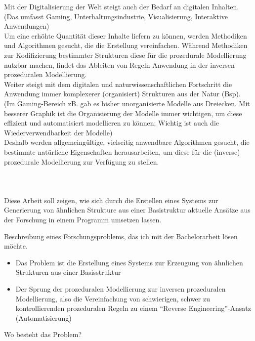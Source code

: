 Mit der Digitalisierung der Welt steigt auch der Bedarf an digitalen Inhalten.\\
(Das umfasst Gaming, Unterhaltungsindustrie, Visualisierung, Interaktive Anwendungen)\\
Um eine erhöhte Quantität dieser Inhalte liefern zu können, werden Methodiken und Algorithmen gesucht, die die Erstellung
vereinfachen.
Während Methodiken zur Kodifizierung bestimmter Strukturen diese für die prozedurale Modellierung nutzbar machen,
findet das Ableiten von Regeln Anwendung in der inversen prozeduralen Modellierung.\\
Weiter steigt mit dem digitalen und naturwissenschaftlichen Fortschritt die Anwendung immer komplexerer (organisiert)
Strukturen aus der Natur (Bsp).\\
(Im Gaming-Bereich zB. gab es bisher unorganisierte Modelle aus Dreiecken. Mit besserer Graphik ist die Organisierung der
Modelle immer wichtigen, um diese effizient und automatisiert modellieren zu können; Wichtig ist auch die Wiederverwendbarkeit
der Modelle)\\
Deshalb werden allgemeingültige, vielseitig anwendbare Algorithmen gesucht, die bestimmte natürliche Eigenschaften
herausarbeiten, um diese für die (inverse) prozedurale Modellierung zur Verfügung zu stellen.
\\~\\

\\~\\
Diese Arbeit soll zeigen, wie sich durch die Erstellen eines Systems zur Generierung von ähnlichen Strukture aus einer
Basistruktur aktuelle Ansätze aus der Forschung in einem Programm umsetzen lassen.





Beschreibung eines Forschungsproblems, das ich mit der Bachelorarbeit lösen möchte.

\begin{itemize}
    \item Das Problem ist die Erstellung eines Systems zur Erzeugung von ähnlichen Strukturen aus einer Basisstruktur
    \item Der Sprung der prozeduralen Modellierung zur inversen prozeduralen Modellierung, also die Vereinfachung von schwierigen,
    schwer zu kontrollierenden prozeduralen Regeln zu einem "`Reverse Engineering"'-Ansatz (Automatisierung)
\end{itemize}

Wo besteht das Problem?

